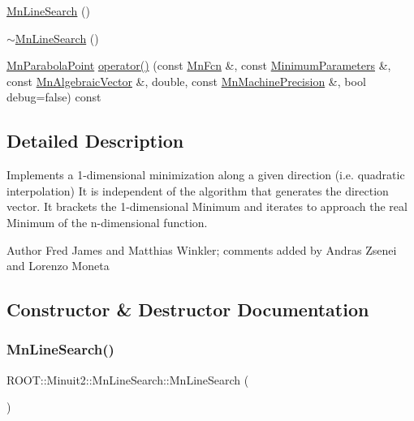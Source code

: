 \begin{DoxyCompactItemize}
\item 
\mbox{\hyperlink{classROOT_1_1Minuit2_1_1MnLineSearch_ac8e8d450c628b3af3becdfc1badd0180}{Mn\+Line\+Search}} ()
\item 
\mbox{\hyperlink{classROOT_1_1Minuit2_1_1MnLineSearch_a84ecd0790b8822023e2e1d7abb102f6c}{$\sim$\+Mn\+Line\+Search}} ()
\item 
\mbox{\hyperlink{classROOT_1_1Minuit2_1_1MnParabolaPoint}{Mn\+Parabola\+Point}} \mbox{\hyperlink{classROOT_1_1Minuit2_1_1MnLineSearch_a4caf80e70d50f3bfa149d28836d26a95}{operator()}} (const \mbox{\hyperlink{classROOT_1_1Minuit2_1_1MnFcn}{Mn\+Fcn}} \&, const \mbox{\hyperlink{classROOT_1_1Minuit2_1_1MinimumParameters}{Minimum\+Parameters}} \&, const \mbox{\hyperlink{namespaceROOT_1_1Minuit2_a62ed97730a1ca8d3fbaec64a19aa11c9}{Mn\+Algebraic\+Vector}} \&, double, const \mbox{\hyperlink{classROOT_1_1Minuit2_1_1MnMachinePrecision}{Mn\+Machine\+Precision}} \&, bool debug=false) const
\end{DoxyCompactItemize}


\subsection{Detailed Description}
Implements a 1-\/dimensional minimization along a given direction (i.\+e. quadratic interpolation) It is independent of the algorithm that generates the direction vector. It brackets the 1-\/dimensional Minimum and iterates to approach the real Minimum of the n-\/dimensional function.

\begin{DoxyAuthor}{Author}
Fred James and Matthias Winkler; comments added by Andras Zsenei and Lorenzo Moneta 
\end{DoxyAuthor}


\subsection{Constructor \& Destructor Documentation}
\mbox{\label{classROOT_1_1Minuit2_1_1MnLineSearch_ac8e8d450c628b3af3becdfc1badd0180}} 
\subsubsection{\texorpdfstring{MnLineSearch()}{MnLineSearch()}\hspace{0.1cm}{\footnotesize\ttfamily [1/3]}}
{\footnotesize\ttfamily R\+O\+O\+T\+::\+Minuit2\+::\+Mn\+Line\+Search\+::\+Mn\+Line\+Search (\begin{DoxyParamCaption}{ }\end{DoxyParamCaption})\hspace{0.3cm}{\ttfamily [inline]}}

